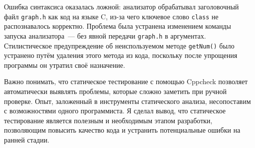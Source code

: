\documentclass{article}[14pt]
\begin{document}
Ошибка синтаксиса оказалась ложной: анализатор обрабатывал заголовочный файл
\texttt{graph.h} как код на языке C, из-за чего ключевое слово \texttt{class}
не распознавалось корректно. Проблема была устранена изменением команды запуска
анализатора~--- без явной передачи \texttt{graph.h} в аргументах. Стилистическое
предупреждение об неиспользуемом методе \texttt{getNum()} было устранено путём
удаления этого метода из кода, поскольку после упрощения программы он утратил
своё назначение.
 
Важно понимать, что статическое тестирование с помощью Cppcheck позволяет
автоматически выявлять проблемы, которые сложно заметить при ручной проверке.
Опыт, заложенный в инструменты статического анализа, несопоставим с возможностями
одного программиста. Я сделал вывод, что статическое тестирование является
полезным и необходимым этапом разработки, позволяющим повысить качество кода
и устранить потенциальные ошибки на ранней стадии.
\end{document}
